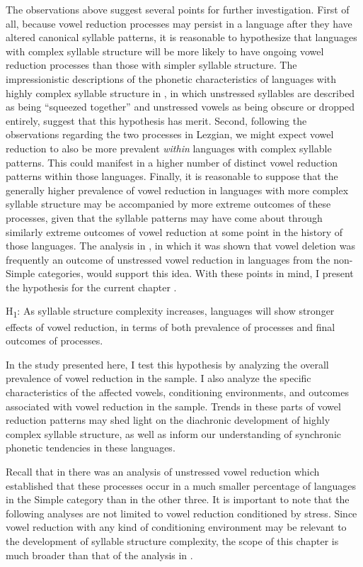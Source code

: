   The observations above suggest several points for further investigation. First of all, because vowel reduction processes may persist in a language after they have altered canonical syllable patterns, it is reasonable to hypothesize that languages with complex syllable structure will be more likely to have ongoing vowel reduction processes than those with simpler syllable structure. The impressionistic descriptions of the phonetic characteristics of languages with highly complex syllable structure in , in which unstressed syllables are described as being “squeezed together” and unstressed vowels as being obscure or dropped entirely, suggest that this hypothesis has merit. Second, following the observations regarding the two processes in Lezgian, we might expect vowel reduction to also be more prevalent \textit{within} languages with complex syllable patterns. This could manifest in a higher number of distinct vowel reduction patterns within those languages. Finally, it is reasonable to suppose that the generally higher prevalence of vowel reduction in languages with more complex syllable structure may be accompanied by more extreme outcomes of these processes, given that the syllable patterns may have come about through similarly extreme outcomes of vowel reduction at some point in the history of those languages. The analysis in , in which it was shown that vowel deletion was frequently an outcome of unstressed vowel reduction in languages from the non-Simple categories, would support this idea. With these points in mind, I present the hypothesis for the current chapter .

\ea\label{ex:6.3}
   H\textsubscript{1}:  As syllable structure complexity increases, languages will show stronger effects of vowel reduction, in terms of both prevalence of processes and final outcomes of processes.
\z

  In the study presented here, I test this hypothesis by analyzing the overall prevalence of vowel reduction in the sample. I also analyze the specific characteristics of the affected vowels, conditioning environments, and outcomes associated with vowel reduction in the sample. Trends in these parts of vowel reduction patterns may shed light on the diachronic development of highly complex syllable structure, as well as inform our understanding of synchronic phonetic tendencies in these languages.

  Recall that in  there was an analysis of unstressed vowel reduction which established that these processes occur in a much smaller percentage of languages in the Simple category than in the other three. It is important to note that the following analyses are not limited to vowel reduction conditioned by stress. Since vowel reduction with any kind of conditioning environment may be relevant to the development of syllable structure complexity, the scope of this chapter is much broader than that of the analysis in .

